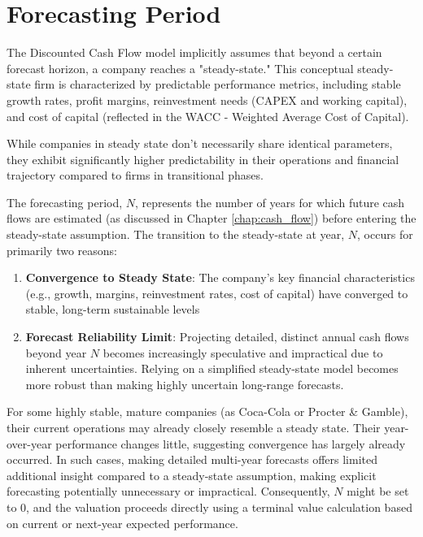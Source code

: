 \chapter{Forecasting Period} \label{chap:forecasting_period}

The Discounted Cash Flow model implicitly assumes that beyond a certain forecast horizon, a company reaches a "steady-state." This conceptual steady-state firm is characterized by predictable performance metrics, including stable growth rates, profit margins, reinvestment needs (CAPEX and working capital), and cost of capital (reflected in the WACC - Weighted Average Cost of Capital).

While companies in steady state don't necessarily share identical parameters, they exhibit significantly higher predictability in their operations and financial trajectory compared to firms in transitional phases.

The forecasting period, \(N\), represents the number of years for which future cash flows are estimated (as discussed in Chapter \ref{chap:cash_flow}) before entering the steady-state assumption. The transition to the steady-state at year, \(N\), occurs for primarily two reasons:

\begin{enumerate}
    \item \textbf{Convergence to Steady State}: The company's key financial characteristics (e.g., growth, margins, reinvestment rates, cost of capital) have converged to stable, long-term sustainable levels
    \item  \textbf{Forecast Reliability Limit}: Projecting detailed, distinct annual cash flows beyond year \(N\) becomes increasingly speculative and impractical due to inherent uncertainties. Relying on a simplified steady-state model becomes more robust than making highly uncertain long-range forecasts.
\end{enumerate}

For some highly stable, mature companies (as Coca-Cola or Procter \& Gamble), their current operations may already closely resemble a steady state. Their year-over-year performance changes little, suggesting convergence has largely already occurred. In such cases, making detailed multi-year forecasts offers limited additional insight compared to a steady-state assumption, making explicit forecasting potentially unnecessary or impractical. Consequently, \(N\) might be set to \(0\), and the valuation proceeds directly using a terminal value calculation based on current or next-year expected performance.

